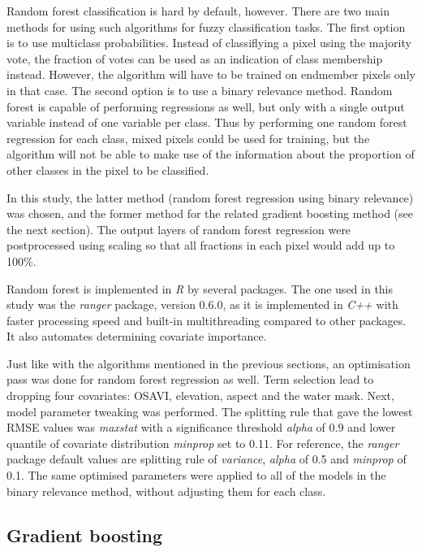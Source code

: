\documentclass[a4paper,10pt]{book}
\begin{document}
Random forest classification is hard by default, however. There are two main methods for using such algorithms for fuzzy classification tasks. The first option is to use multiclass probabilities. Instead of classiflying a pixel using the majority vote, the fraction of votes can be used as an indication of class membership instead. However, the algorithm will have to be trained on endmember pixels only in that case. The second option is to use a binary relevance method. Random forest is capable of performing regressions as well, but only with a single output variable instead of one variable per class. Thus by performing one random forest regression for each class, mixed pixels could be used for training, but the algorithm will not be able to make use of the information about the proportion of other classes in the pixel to be classified.

In this study, the latter method (random forest regression using binary relevance) was chosen, and the former method for the related gradient boosting method (see the next section). The output layers of random forest regression were postprocessed using scaling so that all fractions in each pixel would add up to 100\%.

Random forest is implemented in \textit{R} by several packages. The one used in this study was the \textit{ranger} package, version 0.6.0, as it is implemented in \textit{C++} with faster processing speed and built-in multithreading compared to other packages. It also automates determining covariate importance.

Just like with the algorithms mentioned in the previous sections, an optimisation pass was done for random forest regression as well. Term selection lead to dropping four covariates: OSAVI, elevation, aspect and the water mask. Next, model parameter tweaking was performed. The splitting rule that gave the lowest RMSE values was \textit{maxstat} with a significance threshold \textit{alpha} of 0.9 and lower quantile of covariate distribution \textit{minprop} set to 0.11. For reference, the \textit{ranger} package default values are splitting rule of \textit{variance}, \textit{alpha} of 0.5 and \textit{minprop} of 0.1. The same optimised parameters were applied to all of the models in the binary relevance method, without adjusting them for each class.

\subsection{Gradient boosting}
\end{document}
